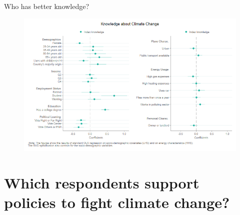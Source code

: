 \begin{framefont}{\small}
\begin{frame}{Who has better knowledge?%
	}
\begin{figure}	
	\vspace{-.2cm}
	\includegraphics[width=.86\paperwidth]{../figures/FR/Coefplot_SetAB_index_knowledge.png}
\end{figure}
\end{frame}



\section{Which respondents support policies to fight climate change?}%


\end{framefont}
